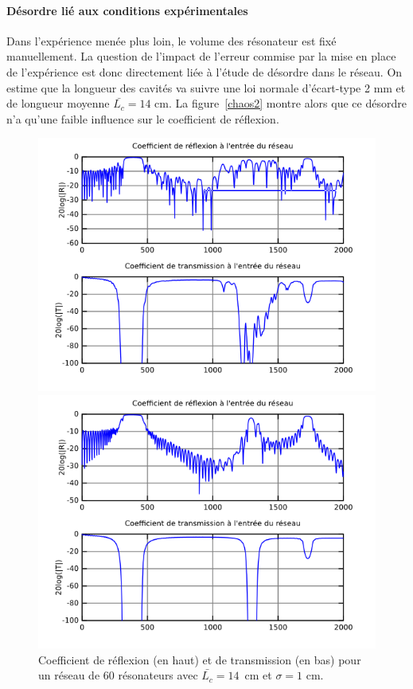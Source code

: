 \paragraph{Désordre lié aux conditions expérimentales}
Dans l'expérience menée plus loin, le volume des résonateur est fixé manuellement. La question de l'impact de l'erreur commise par la mise en place de l'expérience est donc directement liée à l'étude de désordre dans le réseau. On estime que la longueur des cavités va suivre une loi normale d'écart-type 2 mm et de longueur moyenne $\bar{L_c}=14$ cm. La figure~\ref{chaos2} montre alors que ce désordre n'a qu'une faible influence sur le coefficient de réflexion. 


\begin{figure}[!h]
	\begin{minipage}{0.45 \textwidth}
		\centering
		\includegraphics[scale=0.5]{./images_chp1/chaos_10mm.png}
		\caption{\label{chaos10} Coefficient de réflexion (en haut) et de transmission (en bas) pour un réseau de 60 résonateurs avec $\bar{L_c}=14$~cm et $\sigma =1$ cm.}
	\end{minipage}
\hspace{0.5cm}
	\begin{minipage}{0.45 \textwidth}
		\centering
		\includegraphics[scale=0.5]{./images_chp1/chaos_2mm.png}

\end{minipage}
\end{figure}
